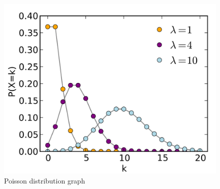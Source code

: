         \begin{figure}[t]
            \centering
            \includegraphics[width=\linewidth]{Figure/poissonDistribution.png}
            \caption{Poisson distribution graph}
            \label{fig:poissonDistribution}
        \end{figure}